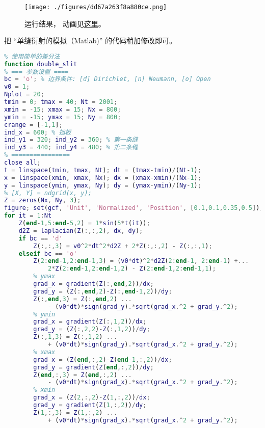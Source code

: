 
\begin{issues}
\issueDraft
\end{issues}


\begin{figure}[ht]
\centering
\texttt{[image: ./figures/dd67a263f8a880ce.png]}
\caption{运行结果， 动画见\href{https://wuli.wiki/apps/db_slit.html}{这里}。} \label{fig_DbSliN_1}
\end{figure}

把 “单缝衍射的模拟（Matlab)” 的代码稍加修改即可。
\begin{lstlisting}[language=matlab, caption=double\_slit.m]
% 双缝干涉的模拟
% 使用简单的差分法
function double_slit
% === 参数设置 ====
bc = 'o'; % 边界条件: [d] Dirichlet, [n] Neumann, [o] Open
v0 = 1;
Nplot = 20;
tmin = 0; tmax = 40; Nt = 2001;
xmin = -15; xmax = 15; Nx = 800;
ymin = -15; ymax = 15; Ny = 800;
crange = [-1,1];
ind_x = 600; % 挡板
ind_y1 = 320; ind_y2 = 360; % 第一条缝
ind_y3 = 440; ind_y4 = 480; % 第二条缝
% ================
close all;
t = linspace(tmin, tmax, Nt); dt = (tmax-tmin)/(Nt-1);
x = linspace(xmin, xmax, Nx); dx = (xmax-xmin)/(Nx-1);
y = linspace(ymin, ymax, Ny); dy = (ymax-ymin)/(Ny-1);
% [X, Y] = ndgrid(x, y);
Z = zeros(Nx, Ny, 3);
figure; set(gcf, 'Unit', 'Normalized', 'Position', [0.1,0.1,0.35,0.5]);
for it = 1:Nt
    Z(end-1,5:end-5,2) = 1*sin(5*t(it));
    d2Z = laplacian(Z(:,:,2), dx, dy);
    if bc == 'd'
        Z(:,:,3) = v0^2*dt^2*d2Z + 2*Z(:,:,2) - Z(:,:,1);
    elseif bc == 'o'
        Z(2:end-1,2:end-1,3) = (v0*dt)^2*d2Z(2:end-1, 2:end-1) +...
            2*Z(2:end-1,2:end-1,2) - Z(2:end-1,2:end-1,1);
        % ymax
        grad_x = gradient(Z(:,end,2))/dx;
        grad_y = (Z(:,end,2)-Z(:,end-1,2))/dy;
        Z(:,end,3) = Z(:,end,2) ...
            - (v0*dt)*sign(grad_y).*sqrt(grad_x.^2 + grad_y.^2);
        % ymin
        grad_x = gradient(Z(:,1,2))/dx;
        grad_y = (Z(:,2,2)-Z(:,1,2))/dy;
        Z(:,1,3) = Z(:,1,2) ...
            + (v0*dt)*sign(grad_y).*sqrt(grad_x.^2 + grad_y.^2);
        % xmax
        grad_x = (Z(end,:,2)-Z(end-1,:,2))/dx;
        grad_y = gradient(Z(end,:,2))/dy;
        Z(end,:,3) = Z(end,:,2) ...
            - (v0*dt)*sign(grad_x).*sqrt(grad_x.^2 + grad_y.^2);
        % xmin
        grad_x = (Z(2,:,2)-Z(1,:,2))/dx;
        grad_y = gradient(Z(1,:,2))/dy;
        Z(1,:,3) = Z(1,:,2) ...
            + (v0*dt)*sign(grad_x).*sqrt(grad_x.^2 + grad_y.^2);

\end{lstlisting}
